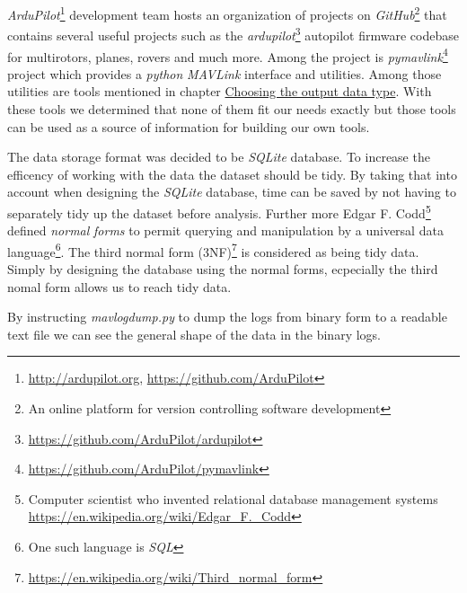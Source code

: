 \documentclass[12pt,oneside]{reedthesis}
\theoremstyle{definition}
\theoremstyle{definition}
\theoremstyle{definition}
\theoremstyle{remark}
\begin{document}
\emph{ArduPilot}\footnote{\url{http://ardupilot.org},
  \url{https://github.com/ArduPilot}} development team hosts an
organization of projects on \emph{GitHub}\footnote{An online platform
  for version controlling software development} that contains several
useful projects such as the \emph{ardupilot}\footnote{\url{https://github.com/ArduPilot/ardupilot}}
autopilot firmware codebase for multirotors, planes, rovers and much
more. Among the project is \emph{pymavlink}\footnote{\url{https://github.com/ArduPilot/pymavlink}}
project which provides a \emph{python} \emph{MAVLink} interface and
utilities. Among those utilities are tools mentioned in chapter
\protect\hyperlink{choosing-the-output-data-type}{Choosing the output
data type}. With these tools we determined that none of them fit our
needs exactly but those tools can be used as a source of information for
building our own tools.

The data storage format was decided to be \emph{SQLite} database. To
increase the efficency of working with the data the dataset should be
tidy. By taking that into account when designing the \emph{SQLite}
database, time can be saved by not having to separately tidy up the
dataset before analysis. Further more Edgar F. Codd\footnote{Computer
  scientist who invented relational database management systems
  \url{https://en.wikipedia.org/wiki/Edgar_F._Codd}} defined
\emph{normal} \emph{forms} to permit querying and manipulation by a
universal data language\footnote{One such language is \emph{SQL}}. The
third normal form (3NF)\footnote{\url{https://en.wikipedia.org/wiki/Third_normal_form}}
is considered as being tidy data. Simply by designing the database using
the normal forms, ecpecially the third nomal form allows us to reach
tidy data.

By instructing \emph{mavlogdump.py} to dump the logs from binary form to
a readable text file we can see the general shape of the data in the
binary logs.
\end{document}
